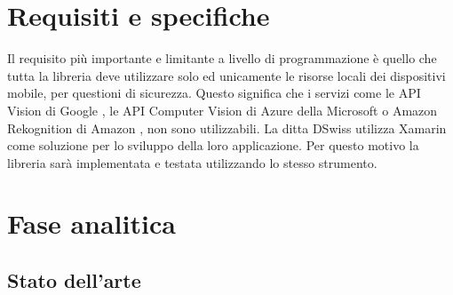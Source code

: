 \documentclass[twoside]{supsistudent}
\newcommand{\Decaa}{\newline\vspace{0.5mm}\newline\noindent}
\begin{document}
\chapter{Requisiti e specifiche} 
Il requisito più importante e limitante a livello di programmazione è quello che tutta la libreria deve utilizzare solo ed unicamente le risorse locali dei dispositivi mobile, per questioni di sicurezza. Questo significa che i servizi come le API Vision di Google \cite{googleVision}, le API Computer Vision di Azure della Microsoft \cite{microsoftAzure}o Amazon Rekognition di Amazon \cite{amazonReko}, non sono utilizzabili. 
\Decaa
La ditta DSwiss utilizza Xamarin come soluzione per lo sviluppo della loro applicazione. Per questo motivo la libreria sarà implementata e testata utilizzando lo stesso strumento.

\chapter{Fase analitica}
\section{Stato dell'arte} %
\end{document}
